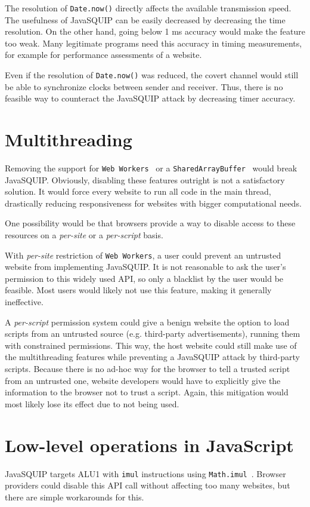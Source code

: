 \documentclass[11pt,
  titlepage=false,
  parskip=half,      %
]{scrreprt}
\begin{document}
The resolution of \texttt{Date.now()} directly affects the available transmission speed.
The usefulness of JavaSQUIP can be easily decreased by decreasing the time resolution.
On the other hand, going below 1 ms accuracy would make the feature too weak.
Many legitimate programs need this accuracy in timing measurements,
for example for performance assessments of a website.

Even if the resolution of \texttt{Date.now()} was reduced,
the covert channel would still be able to synchronize clocks between sender and receiver.
Thus, there is no feasible way to counteract the JavaSQUIP attack by decreasing timer accuracy.

\section{Multithreading}
Removing the support for \texttt{Web Workers}~\cite{webworkers} or a \texttt{SharedArrayBuffer}~\cite{sharedarraybuffer}
would break JavaSQUIP.
Obviously, disabling these features outright is not a satisfactory solution.
It would force every website to run all code in the main thread,
drastically reducing responsiveness for websites with bigger computational needs.

One possibility would be that browsers provide a way to disable access to these resources on a \textit{per-site} or a \textit{per-script} basis.

With \textit{per-site} restriction of \texttt{Web Workers}, a user could prevent an untrusted website from implementing JavaSQUIP.
It is not reasonable to ask the user's permission to this widely used API,
so only a blacklist by the user would be feasible.
Most users would likely not use this feature, making it generally ineffective.

A \textit{per-script} permission system could give a benign website the option to load scripts from an untrusted source (e.g. third-party advertisements),
running them with constrained permissions.
This way, the host website could still make use of the multithreading features while preventing a JavaSQUIP attack by third-party scripts.
Because there is no ad-hoc way for the browser to tell a trusted script from an untrusted one,
website developers would have to explicitly give the information to the browser not to trust a script.
Again, this mitigation would most likely lose its effect due to not being used.

\section{Low-level operations in JavaScript}
JavaSQUIP targets ALU1 with \texttt{imul} instructions using \texttt{Math.imul}~\cite{mathimul}.
Browser providers could disable this API call without affecting too many websites,
but there are simple workarounds for this.
\end{document}
